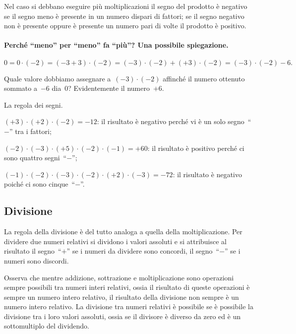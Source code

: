 Nel caso si debbano eseguire più moltiplicazioni il segno del prodotto è negativo se il segno meno è presente
in un numero dispari di fattori; se il segno negativo non è presente oppure è presente un numero pari di volte il prodotto è positivo.

\paragraph{Perché ``meno'' per ``meno'' fa ``più''? Una possibile spiegazione.}
\[0=0\cdot (-2) = (-3+3)\cdot (-2) = (-3)\cdot(-2)+(+3)\cdot(-2)=(-3)\cdot(-2)-6.\]

Quale valore dobbiamo assegnare a~$(-3)\cdot(-2)$ affinché il numero ottenuto sommato a~$-6$ dia~0?
Evidentemente il numero~$+6$.

\begin{exrig}
 \begin{esempio} La regola dei segni.
  \begin{itemize*}
  \item $(+3)\cdot (+2)\cdot (-2) =-12$: il risultato è negativo perché vi è un solo segno~``$-$'' tra i fattori;
  \item $(-2)\cdot (-3)\cdot (+5)\cdot (-2)\cdot (-1) = +60$: il risultato è positivo perché ci sono quattro segni~``$-$'';
  \item $(-1)\cdot (-2)\cdot (-3)\cdot (-2)\cdot (+2)\cdot (-3) = -72$: il risultato è negativo poiché ci sono cinque~``$-$''.
  \end{itemize*}
 \end{esempio}
\end{exrig}

\ovalbox{\risolvii \ref{ese:2.16}, \ref{ese:2.17}, \ref{ese:2.18}}

\subsection{Divisione}

La regola della divisione è del tutto analoga a quella della moltiplicazione.
Per dividere due numeri relativi si dividono i valori assoluti e si attribuisce
al risultato il segno~``$+$'' se i numeri da dividere sono concordi, il segno~``$-$'' se i numeri sono discordi.

Osserva che mentre addizione, sottrazione e moltiplicazione sono operazioni sempre possibili
tra numeri interi relativi, ossia il risultato di queste operazioni è sempre un numero intero
relativo, il risultato della divisione non sempre è un numero intero relativo. La divisione
tra numeri relativi è possibile se è possibile la divisione tra i loro valori assoluti, ossia se
il divisore è diverso da zero ed è un sottomultiplo del dividendo.

